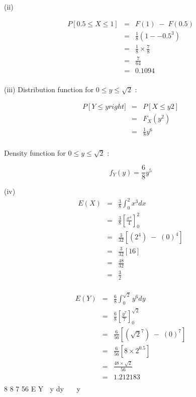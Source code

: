 \documentclass[a4paper,12pt]{article}
\begin{document}
(ii) 

\begin{eqnarray*}
P [ 0.5 \leq  X \leq  1 ] &=& F ( 1 ) \; - \; F ( 0.5 ) \\
&=& \frac{1}{8} \left( 1 - -0.5^3 \right)\\
&=& \frac{1}{8} \times \frac{7}{8} \\
&=& \frac{7}{64}\\
&=& 0.1094 \\
\end{eqnarray*}


(iii) Distribution function for $0 \leq y \leq \sqrt{2}$ :

\begin{eqnarray*}
P \left[ Y \leq y right] 
&=& P \left[ X \leq y 2 \right] \\ 
&=& F_X(y^2) \\ 
&=& \frac{1}{8} y^6 \\
\end{eqnarray*}

Density function for $0 \leq y \leq \sqrt{2}$ :


\[f_Y ( y ) = \frac{6}{8} y^5 \]

(iv)
\begin{eqnarray*}
E(X) &=& \frac{3}{8} \int^{2}_{0} x^3 dx \\
&=& \frac{3}{8} \left[ \frac{x^4}{4} \right]^{2}_{0} \\
&=& \frac{3}{32 } \left[(2^4) \;-\; (0)^4 \right] \\
&=& \frac{3}{32 } \left[ 16 \right] \\
&=& \frac{48}{32}\\
&=& \frac{3}{2}\\
\end{eqnarray*}

\begin{eqnarray*}
E(Y) &=& \frac{6}{8} \int^{\sqrt{2} }_{0} y^6 dy \\
&=& \frac{6}{8} \left[ \frac{y^7}{7} \right]^{\sqrt{2} }_{0} \\
&=& \frac{6}{56 } \left[( \sqrt{2}^7) \;-\; (0)^7 \right] \\
&=& \frac{6}{56 } \left[ 8 \times 2^{0.5} \right] \\
&=& \frac{48 \times \sqrt{2} }{56}\\
&=& 1.212183\\
\end{eqnarray*}
  8 8 7 56
  E Y  y dy   y      
 
\end{document}
